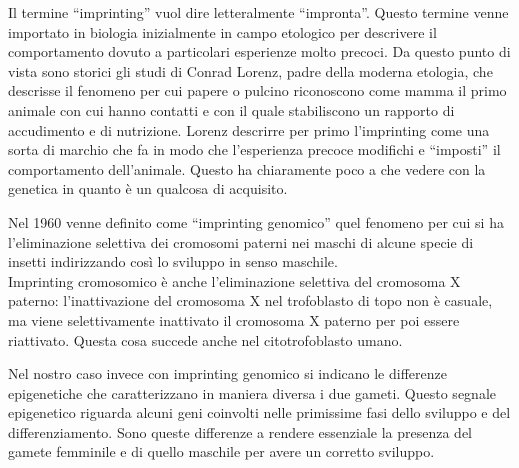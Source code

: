 \documentclass[11pt]{book}
\begin{document}
Il termine ``imprinting'' vuol dire letteralmente ``impronta''. Questo termine venne importato in biologia inizialmente in campo etologico per descrivere il comportamento dovuto a particolari esperienze molto precoci. Da questo punto di vista sono storici gli studi di Conrad Lorenz, padre della moderna etologia, che descrisse il fenomeno per cui papere o pulcino riconoscono come mamma il primo animale con cui hanno contatti e con il quale stabiliscono un rapporto di accudimento e di nutrizione. Lorenz descrirre per primo l’imprinting come una sorta di marchio che fa in modo che l’esperienza precoce modifichi e ``imposti'' il comportamento dell’animale. Questo ha chiaramente poco a che vedere con la genetica in quanto è un qualcosa di acquisito.

Nel 1960 venne definito come ``imprinting genomico'' quel fenomeno per cui si ha l’eliminazione selettiva dei cromosomi paterni nei maschi di alcune specie di insetti indirizzando così lo sviluppo in senso maschile.\\
Imprinting cromosomico è anche l’eliminazione selettiva del cromosoma X paterno: l’inattivazione del cromosoma X nel trofoblasto di topo non è casuale, ma viene selettivamente inattivato il cromosoma X paterno per poi essere riattivato. Questa cosa succede anche nel citotrofoblasto umano.

Nel nostro caso invece con imprinting genomico si indicano le differenze epigenetiche che caratterizzano in maniera diversa i due gameti.
Questo segnale epigenetico riguarda alcuni geni coinvolti nelle primissime fasi dello sviluppo e del differenziamento. Sono queste differenze a rendere essenziale la presenza del gamete femminile e di quello maschile per avere un corretto sviluppo.
\end{document}
